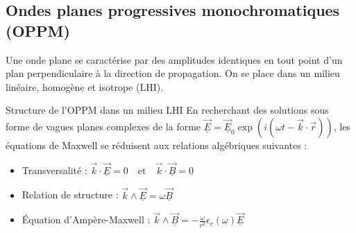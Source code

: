 \documentclass[french]{yLectureNote}
\renewcommand{\vec}{\overrightarrow}
\begin{document}






\subsection{Ondes planes progressives monochromatiques (OPPM)}

Une onde plane se caractérise par des amplitudes identiques en tout point d'un plan perpendiculaire à la direction de propagation. On se place dans un milieu linéaire, homogène et isotrope (LHI).

\begin{definition}{Structure de l'OPPM dans un milieu LHI}
En recherchant des solutions sous forme de vagues planes complexes de la forme $\vec{\underline{E}} = \vec{\underline{E}}_0 \exp\left(i(\omega t - \vec{k}\cdot\vec{r})\right)$, les équations de Maxwell se réduisent aux relations algébriques suivantes :
\begin{itemize}
    \item Transversalité : $\vec{k}\cdot \vec{\underline{E}} = 0 \quad \text{et} \quad \vec{k}\cdot \vec{\underline{B}} = 0$
    \item Relation de structure : $\vec{k}\wedge \vec{\underline{E}} = \omega \vec{\underline{B}}$
    \item Équation d'Ampère-Maxwell : $\vec{k}\wedge \vec{\underline{B}} = -\frac{\omega}{c^2}\epsilon_r(\omega)\vec{\underline{E}}$
\end{itemize}
\end{definition}
\end{document}

